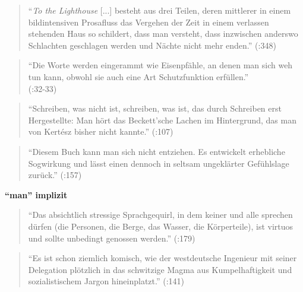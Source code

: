 \documentclass[fontsize=12pt]{scrartcl}
\begin{document}
\singlespacing
\begin{quote}
"`\textit{To the Lighthouse} [...] be\-steht aus drei Teilen, deren mittlerer in einem bildintensiven Prosafluss das Vergehen der Zeit in einem verlassen stehenden Haus so schildert, dass man versteht, dass inzwischen anderswo Schlachten geschlagen werden und N\"achte nicht mehr enden."' (\cite{Draesner2013}:348)
\end{quote}
\onehalfspacing


\singlespacing
\begin{quote}
"`Die Worte werden eingerammt wie Eisenpf\"ahle, an denen man sich weh tun kann, obwohl sie auch eine Art Schutzfunktion erf\"ullen."'\\ (\cite{Hartwig2012}:32-33)
\end{quote}
\onehalfspacing


\singlespacing
\begin{quote}
"`Schrei\-ben, was nicht ist, schrei\-ben, was ist, das durch Schrei\-ben erst Hergestellte: Man h\"ort das Beckett'sche Lachen im Hintergrund, das man von Kert\'{e}sz bis\-her nicht kannte."' (\cite{Hartwig2012}:107)
\end{quote}
\onehalfspacing



\singlespacing
\begin{quote}
"`Diesem Buch kann man sich nicht entziehen. Es ent\-wickelt erhebliche Sogwirkung und l\"asst einen dennoch in seltsam ungekl\"arter Gef\"uhlslage zur\"uck."' (\cite{Hartwig2012}:157)
\end{quote}
\onehalfspacing

\textbf{"`man"' implizit}



\singlespacing
\begin{quote}
"`Das absichtlich stressige Sprachgequirl, in dem keiner und alle sprechen d\"urfen (die Per\-so\-nen, die Berge, das Wasser, die K\"orperteile), ist virtuos und sollte un\-be\-dingt genossen werden."' (\cite{Hartwig2012}:179)\end{quote}
\onehalfspacing


\singlespacing
\begin{quote}
"`Es ist schon ziemlich komisch, wie der westdeutsche Ingenieur mit seiner Delegation pl\"otzlich in das schwitzige Magma aus Kumpelhaftigkeit und sozialistischem Jargon hineinplatzt."' (\cite{Hartwig2012}:141)
\end{quote}
\onehalfspacing
\end{document}
